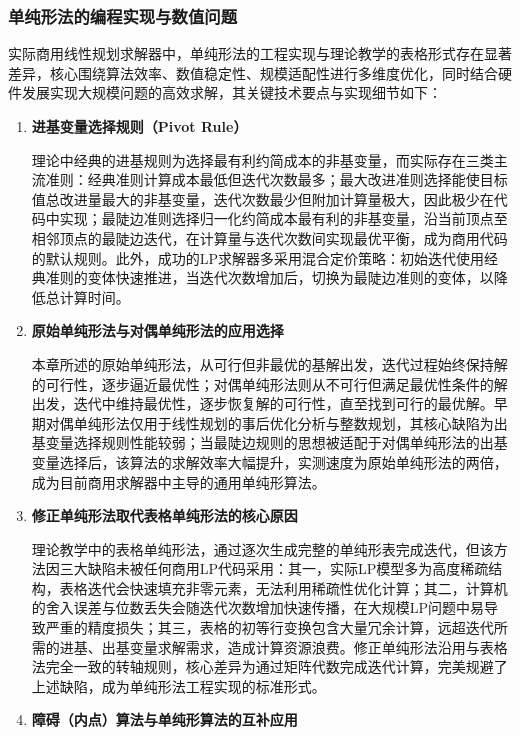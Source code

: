\documentclass[12pt]{article}
\theoremstyle{plain}
\theoremstyle{definition}
\begin{document}
\subsubsection{单纯形法的编程实现与数值问题}\label{subsubsec:implementation}

实际商用线性规划求解器中，单纯形法的工程实现与理论教学的表格形式存在显著差异，核心围绕算法效率、数值稳定性、规模适配性进行多维度优化，同时结合硬件发展实现大规模问题的高效求解，其关键技术要点与实现细节如下：
\begin{enumerate}
    \item \textbf{进基变量选择规则（Pivot Rule）}
    
    理论中经典的进基规则为选择最有利约简成本的非基变量，而实际存在三类主流准则：经典准则计算成本最低但迭代次数最多；最大改进准则选择能使目标值总改进量最大的非基变量，迭代次数最少但附加计算量极大，因此极少在代码中实现；最陡边准则选择归一化约简成本最有利的非基变量，沿当前顶点至相邻顶点的最陡边迭代，在计算量与迭代次数间实现最优平衡，成为商用代码的默认规则。此外，成功的LP求解器多采用混合定价策略：初始迭代使用经典准则的变体快速推进，当迭代次数增加后，切换为最陡边准则的变体，以降低总计算时间。

    \item \textbf{原始单纯形法与对偶单纯形法的应用选择}
    
    本章所述的原始单纯形法，从可行但非最优的基解出发，迭代过程始终保持解的可行性，逐步逼近最优性；对偶单纯形法则从不可行但满足最优性条件的解出发，迭代中维持最优性，逐步恢复解的可行性，直至找到可行的最优解。早期对偶单纯形法仅用于线性规划的事后优化分析与整数规划，其核心缺陷为出基变量选择规则性能较弱；当最陡边规则的思想被适配于对偶单纯形法的出基变量选择后，该算法的求解效率大幅提升，实测速度为原始单纯形法的两倍，成为目前商用求解器中主导的通用单纯形算法。

    \item \textbf{修正单纯形法取代表格单纯形法的核心原因}
    
    理论教学中的表格单纯形法，通过逐次生成完整的单纯形表完成迭代，但该方法因三大缺陷未被任何商用LP代码采用：其一，实际LP模型多为高度稀疏结构，表格迭代会快速填充非零元素，无法利用稀疏性优化计算；其二，计算机的舍入误差与位数丢失会随迭代次数增加快速传播，在大规模LP问题中易导致严重的精度损失；其三，表格的初等行变换包含大量冗余计算，远超迭代所需的进基、出基变量求解需求，造成计算资源浪费。修正单纯形法沿用与表格法完全一致的转轴规则，核心差异为通过矩阵代数完成迭代计算，完美规避了上述缺陷，成为单纯形法工程实现的标准形式。

    \item \textbf{障碍（内点）算法与单纯形算法的互补应用}
    

\end{enumerate}
\end{document}
